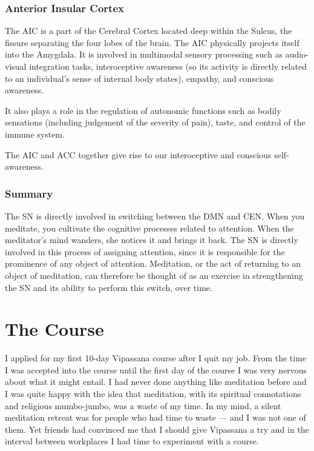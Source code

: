 \documentclass[a4paper, amsfonts, amssymb, amsmath, reprint, showkeys, nofootinbib, twoside]{revtex4-1}
\begin{document}
\subsubsection{Anterior Insular Cortex}

The AIC is a part of the Cerebral Cortex located deep within the Sulcus, the
fissure separating the four lobes of the brain. The AIC physically projects itself
into the Amygdala. It is involved in multimodal sensory processing such as
audio-visual integration tasks, interoceptive awareness (so its activity is directly
related to an individual's sense of internal body states), empathy, and conscious
awareness. \cite{aicemotion}

It also plays a role in the regulation of autonomic functions such as bodily
sensations (including judgement of the severity of pain), taste, and control of the
immune system. \cite{aicautonomic}

The AIC and ACC together give rise to our interoceptive and conscious
self-awareness.  \cite{selfaware}

\subsubsection{Summary}

The SN is directly involved in switching between the DMN and CEN. When you meditate,
you cultivate the cognitive processes related to attention.
When the meditator's mind wanders, she notices it and brings it back.
The SN is directly involved in this process of assigning attention, since it is
responsible for the prominence of any object of attention.
Meditation, or the act of returning to an object of meditation, can therefore be
thought of as an exercise in strengthening the SN and its ability to perform this switch, over time.


\section{The Course}

I applied for my first 10-day Vipassana course after I quit my job. From the time I
was accepted into the course until the first day of the course I was very nervous
about what it might entail. I had never done anything like meditation before
and I was quite happy with the idea that meditation, with its spiritual connotations
and religious mumbo-jumbo, was a waste of my time. In my mind, a silent meditation retreat was
for people who had time to waste --- and I was not one of them. Yet friends had convinced me that I
should give Vipassana a try and in the interval between workplaces I had
time to experiment with a course.
\end{document}

